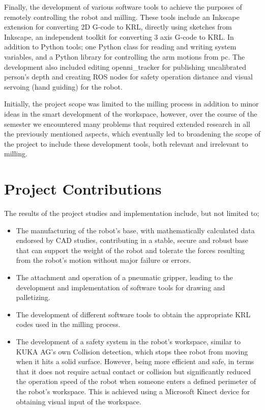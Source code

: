 \medskip
	
	Finally, the development of various software tools to achieve the purposes of remotely controlling the robot and milling. These tools include an Inkscape extension for converting 2D G-code to KRL, directly using sketches from Inkscape, an independent toolkit for converting 3 axis G-code to KRL. In addition to Python tools; one Python class for reading and writing system variables, and a Python library for controlling the arm motions from pc. The development also included editing openni\_tracker for publishing uncalibrated person's depth and creating ROS nodes for safety operation distance and visual servoing (hand guiding) for the robot.
	
	Initially, the project scope was limited to the milling process in addition to minor ideas in the smart development of the workspace, however, over the course of the semester we encountered many problems that required extended research in all the previously mentioned aspects, which eventually led to broadening the scope of the project to include these development tools, both relevant and irrelevant to milling. 

\section{Project Contributions}
	The results of the project studies and implementation include, but not limited to; 
\begin{itemize}
	\item The manufacturing of the robot’s base, with mathematically calculated data endorsed by CAD studies, contributing in a stable, secure and robust base that can support the weight of the robot and tolerate the forces resulting from the robot’s motion without major failure or errors.
	\item The attachment and operation of a pneumatic gripper, leading to the development and implementation of software tools for drawing and palletizing.
	\item The development of different software tools to obtain the appropriate KRL codes used in the milling process.
	\item The development of a safety system in the robot’s workspace, similar to KUKA AG’s own Collision detection, which stops thee robot from moving when it hits a solid surface. However, being more efficient and safe, in terms that it does not require actual contact or collision but significantly reduced the operation speed of the robot when someone enters a defined perimeter of the robot’s workspace. This is achieved using a Microsoft Kinect device for obtaining visual input of the workspace.
\end{itemize}

